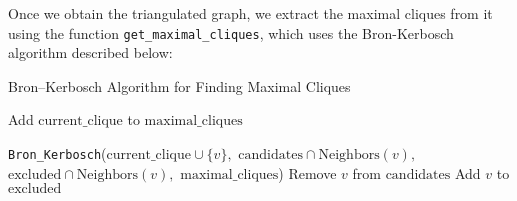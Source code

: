 \documentclass{article}
\begin{document}
\begin{center}
\end{center}
    Once we obtain the triangulated graph, we extract the maximal cliques from it using the function \texttt{get\_maximal\_cliques}, which uses the Bron-Kerbosch algorithm described below:

\begin{algorithm}
\caption{Bron–Kerbosch Algorithm for Finding Maximal Cliques}
\begin{algorithmic}[1]
            \State Add $\text{current\_clique}$ to $\text{maximal\_cliques}$
            \State \Return
        \EndIf
        
            \State \texttt{Bron\_Kerbosch}($\text{current\_clique} \cup \{v\},$
            \State \hspace{1cm} $\text{candidates} \cap \text{Neighbors}(v),$
            \State \hspace{1cm} $\text{excluded} \cap \text{Neighbors}(v),$
            \State \hspace{1cm} $\text{maximal\_cliques}$)
            \State Remove $v$ from $\text{candidates}$
            \State Add $v$ to $\text{excluded}$
        \EndFor
    \EndProcedure
\end{algorithmic}
\end{algorithm}
\end{document}
